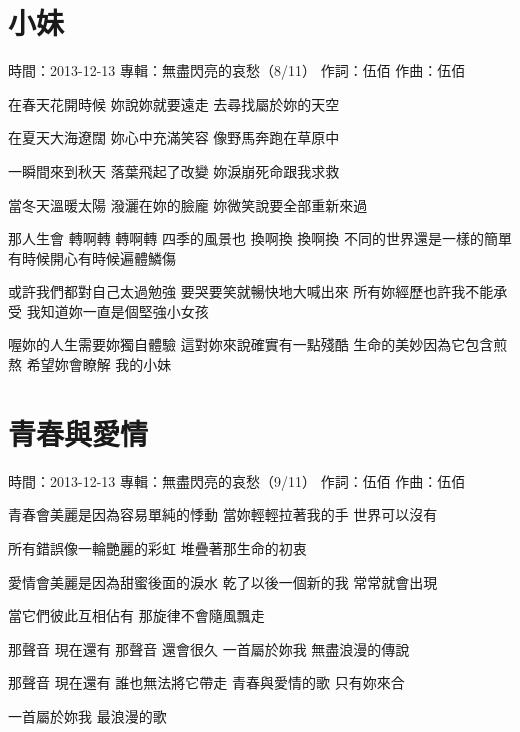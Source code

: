 \documentclass[UTF8,a4paper,oneside,twocolumn,12pt]{ctexbook}
\newcommand{\infopair}[2]{\textbullet #1：#2}
\newcommand{\zc}[1][伍佰]{\infopair{作詞}{#1}}
\newcommand{\zq}[1][伍佰]{\infopair{作曲}{#1}}
\newcommand{\zj}[1]{\infopair{專輯}{#1}}
\newcommand{\sj}[1]{\infopair{時間}{#1}}
\newenvironment{info}{\begin{flushleft}\kaishu
	}
	{\end{flushleft}\normalsize\yahei\par}
\newenvironment{lyric}{
	}
{}
\begin{document}
\section{小妹}
\begin{info}
	\sj{2013-12-13}
	\zj{無盡閃亮的哀愁（8/11）}
	\zc
	\zq
\end{info}
\begin{lyric}
	在春天花開時候
	妳說妳就要遠走
	去尋找屬於妳的天空

	在夏天大海遼闊
	妳心中充滿笑容
	像野馬奔跑在草原中

	一瞬間來到秋天
	落葉飛起了改變
	妳淚崩死命跟我求救

	當冬天溫暖太陽
	潑灑在妳的臉龐
	妳微笑說要全部重新來過

	那人生會 轉啊轉 轉啊轉
	四季的風景也 換啊換 換啊換
	不同的世界還是一樣的簡單
	有時候開心有時候遍體鱗傷

	或許我們都對自己太過勉強
	要哭要笑就暢快地大喊出來
	所有妳經歷也許我不能承受
	我知道妳一直是個堅強小女孩

	喔妳的人生需要妳獨自體驗
	這對妳來說確實有一點殘酷
	生命的美妙因為它包含煎熬
	希望妳會瞭解 我的小妹
\end{lyric}

\section{青春與愛情}
\begin{info}
	\sj{2013-12-13}
	\zj{無盡閃亮的哀愁（9/11）}
	\zc
	\zq
\end{info}
\begin{lyric}
	青春會美麗是因為容易單純的悸動
	當妳輕輕拉著我的手  世界可以沒有

	所有錯誤像一輪艷麗的彩虹
	堆疊著那生命的初衷

	愛情會美麗是因為甜蜜後面的淚水
	乾了以後一個新的我  常常就會出現

	當它們彼此互相佔有
	那旋律不會隨風飄走

	那聲音  現在還有  那聲音  還會很久
	一首屬於妳我  無盡浪漫的傳說

	那聲音  現在還有  誰也無法將它帶走
	青春與愛情的歌  只有妳來合

	一首屬於妳我  最浪漫的歌
\end{lyric}
\end{document}
